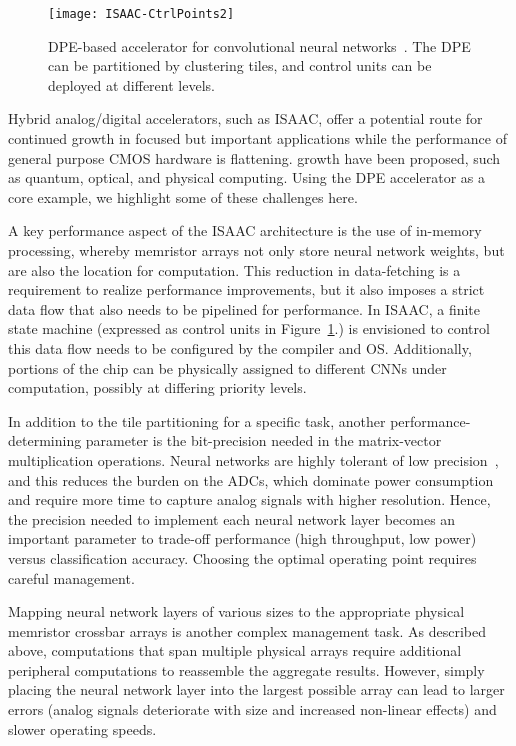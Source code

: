 \begin{figure}[t]
\centering
\texttt{[image: ISAAC-CtrlPoints2]}
\caption{DPE-based accelerator for convolutional neural
networks~\cite{shafiee2016isaac}.
The DPE can be partitioned by clustering tiles, and control units can be
deployed at different levels.}
\label{isaac}
\end{figure}

Hybrid analog/digital accelerators, such as ISAAC, offer a potential route for
continued growth in focused but important applications while the performance of
general purpose CMOS hardware is flattening.
growth have been proposed, such as quantum, optical, and physical computing.
Using the DPE accelerator as a core example, we highlight some of these
challenges here.

A key performance aspect of the ISAAC architecture is the use of in-memory
processing, whereby memristor arrays not only store neural network weights, but
are also the location for computation. This reduction in data-fetching is a
requirement to realize performance improvements, but it also imposes a strict
data flow that also needs to be pipelined for performance. In ISAAC, a finite
state machine  (expressed as control units in Figure~\ref{isaac}.) is
envisioned to control this data flow needs to be configured by the compiler and
OS. Additionally, portions of the chip can be physically assigned to different
CNNs under computation, possibly at differing priority levels.

In addition to the tile partitioning for a specific task, another
performance-determining parameter is the bit-precision needed in the
matrix-vector multiplication operations. Neural networks are highly tolerant of
low precision~\cite{courbariaux2014low, rastegari2016xnor, zhou2016dorefa}, and
this reduces the burden on the ADCs, which dominate power consumption and
require more time to capture analog signals with higher resolution. Hence, the
precision needed to implement each neural network layer becomes an important
parameter to trade-off performance (high throughput, low power) versus
classification accuracy.  Choosing the optimal operating point requires careful
management.

Mapping neural network layers of various sizes to the appropriate physical
memristor crossbar arrays is another complex management task. As described
above, computations that span multiple physical arrays require additional
peripheral computations to reassemble the aggregate results.  However, simply
placing the neural network layer into the largest possible array can lead to
larger errors (analog signals deteriorate with size and increased non-linear
effects) and slower operating speeds.

